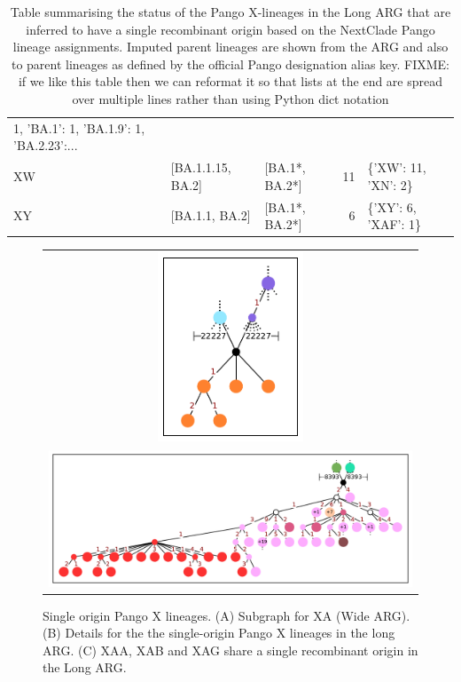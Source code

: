 \documentclass{article}
\begin{document}
\begin{table}
\begin{tabular}{lllrl}
1, 'BA.1': 1, 'BA.1.9': 1, 'BA.2.23':... \\
XW      &       [BA.1.1.15, BA.2] &         [BA.1*, BA.2*] &  11 &
\{'XW': 11, 'XN': 2\} \\
XY      &          [BA.1.1, BA.2] &         [BA.1*, BA.2*] &   6 &
\{'XY': 6, 'XAF': 1\} \\
\bottomrule
\end{tabular}
\caption{\label{tab:pango-single-origin}
Table summarising the status of the Pango X-lineages in the
Long ARG that are inferred to have a single recombinant origin
based on the NextClade Pango lineage assignments. Imputed parent lineages
are shown from the ARG and also to parent lineages as defined by
the official Pango designation alias key.
FIXME: if we like this table then we can reformat it so that lists
at the end are spread over multiple lines rather than using Python
dict notation }
\end{table}


\begin{figure}
\begin{tabularx}{\textwidth}{c}



\includegraphics[width=0.4\textwidth]{figures/Pango_XA_nxcld_tight_graph.pdf}
\\ %
\includegraphics[width=\textwidth]{figures/Pango_XAG_nxcld_tight_graph.pdf}
\end{tabularx}
\caption{\label{fig:pango-single-origin-graph}
Single origin Pango X lineages. (A) Subgraph for XA (Wide ARG).
(B) Details for the the single-origin Pango
X lineages in the long ARG. (C) XAA, XAB and XAG share a single recombinant
origin in the Long ARG. }
\end{figure}
\end{document}
